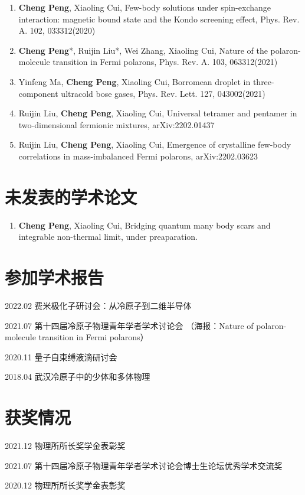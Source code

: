 {
\setlist[enumerate]{}%

\begin{enumerate}[nosep]
    \item {\bfseries\sffamily Cheng Peng}, Xiaoling Cui, Few-body solutions under spin-exchange interaction: magnetic bound state and the Kondo screening effect, Phys. Rev. A. 102, 033312(2020)
    
    \item {\bfseries\sffamily Cheng Peng}*, Ruijin Liu*, Wei Zhang, Xiaoling Cui, Nature of the polaron-molecule transition in Fermi polarons, Phys. Rev. A. 103, 063312(2021)

    \item Yinfeng Ma, {\bfseries\sffamily Cheng Peng}, Xiaoling Cui, Borromean droplet in three-component ultracold bose gases, Phys. Rev. Lett. 127, 043002(2021)

    \item Ruijin Liu, {\bfseries\sffamily Cheng Peng}, Xiaoling Cui, Universal tetramer and pentamer in two-dimensional fermionic mixtures, arXiv:2202.01437

    \item Ruijin Liu, {\bfseries\sffamily Cheng Peng}, Xiaoling Cui, Emergence of crystalline few-body correlations in mass-imbalanced Fermi polarons, arXiv:2202.03623
\end{enumerate}
}


\section*{未发表的学术论文}

{
\setlist[enumerate]{}%

\begin{enumerate}[nosep]
    \item {\bfseries\sffamily Cheng Peng}, Xiaoling Cui, Bridging quantum many body scars and integrable non-thermal limit, under preaparation.
\end{enumerate}
}



\section*{参加学术报告}

2022.02 费米极化子研讨会：从冷原子到二维半导体

2021.07 第十四届冷原子物理青年学者学术讨论会 （海报：Nature of polaron-molecule transition in Fermi polarons）

2020.11 量子自束缚液滴研讨会

2018.04 武汉冷原子中的少体和多体物理


\section*{获奖情况}

2021.12 物理所所长奖学金表彰奖

2021.07 第十四届冷原子物理青年学者学术讨论会博士生论坛优秀学术交流奖

2020.12 物理所所长奖学金表彰奖

\cleardoublepage[plain]%
